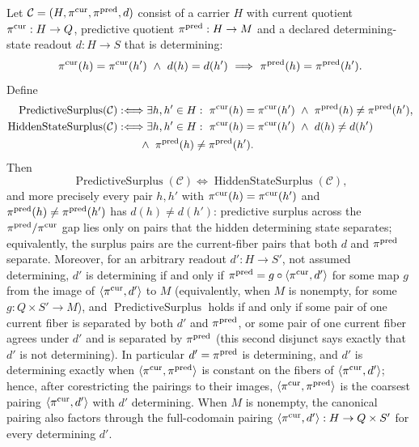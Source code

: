 \begin{theorem}\label{thm:F13b}
Let \(\mathcal C=(H,\pi^{\mathrm{cur}},\pi^{\mathrm{pred}},d)\) consist of a carrier \(H\) with
current quotient \(\pi^{\mathrm{cur}}:H\to Q\), predictive quotient \(\pi^{\mathrm{pred}}:H\to M\) and a
declared determining-state readout \(d:H\to S\) that is determining:
\[
  \currQ(h)=\currQ(h')\ \wedge\ d(h)=d(h')
  \ \Longrightarrow\ \predM(h)=\predM(h').
\]
Define
\begin{align*}
  \operatorname{PredictiveSurplus}(\mathcal C)
  &:\Longleftrightarrow
  \exists h,h'\in H:\ \currQ(h)=\currQ(h')\ \wedge\ \predM(h)\ne\predM(h'),\\
  \operatorname{HiddenStateSurplus}(\mathcal C)
  &:\Longleftrightarrow
  \exists h,h'\in H:\ \currQ(h)=\currQ(h')\ \wedge\ d(h)\ne d(h')\\
  &\qquad{}\wedge\ \predM(h)\ne\predM(h').
\end{align*}
Then
\[
  \operatorname{PredictiveSurplus}(\mathcal C)
  \iff
  \operatorname{HiddenStateSurplus}(\mathcal C),
\]
and more precisely every pair \(h,h'\) with \(\pi^{\mathrm{cur}}(h)=\pi^{\mathrm{cur}}(h')\) and
\(\pi^{\mathrm{pred}}(h)\ne\pi^{\mathrm{pred}}(h')\) has \(d(h)\ne d(h')\): predictive surplus across
the \(\pi^{\mathrm{pred}}/\pi^{\mathrm{cur}}\) gap lies only on pairs that the hidden determining state
separates; equivalently, the surplus pairs are the current-fiber pairs that both \(d\) and
\(\pi^{\mathrm{pred}}\) separate. Moreover, for an arbitrary readout \(d':H\to S'\), not assumed determining, \(d'\) is determining if and only if
\(\pi^{\mathrm{pred}}=g\circ\langle\pi^{\mathrm{cur}},d'\rangle\) for some map \(g\) from the image of
\(\langle\pi^{\mathrm{cur}},d'\rangle\) to \(M\) (equivalently, when \(M\) is nonempty, for some
\(g:Q\times S'\to M\)), and
\(\operatorname{PredictiveSurplus}\) holds if and only if some pair of one current
fiber is separated by both \(d'\) and \(\pi^{\mathrm{pred}}\), or some pair of one current
fiber agrees under \(d'\) and is separated by \(\pi^{\mathrm{pred}}\) (this second disjunct
says exactly that \(d'\) is not determining). In particular
\(d'=\pi^{\mathrm{pred}}\) is determining, and \(d'\) is determining exactly when
\(\langle\pi^{\mathrm{cur}},\pi^{\mathrm{pred}}\rangle\) is constant on the fibers of
\(\langle\pi^{\mathrm{cur}},d'\rangle\); hence, after corestricting the pairings to their images,
\(\langle\pi^{\mathrm{cur}},\pi^{\mathrm{pred}}\rangle\) is the coarsest pairing \(\langle\pi^{\mathrm{cur}},d'\rangle\) with
\(d'\) determining. When \(M\) is nonempty, the canonical pairing also factors
through the full-codomain pairing \(\langle\pi^{\mathrm{cur}},d'\rangle:H\to Q\times S'\) for
every determining \(d'\).
\end{theorem}
